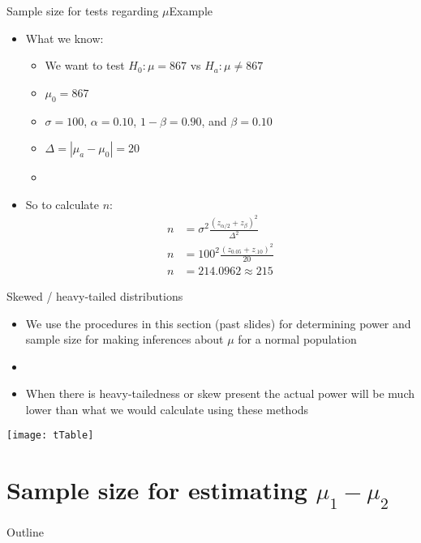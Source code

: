 \documentclass[xcolor=dvipsnames]{beamer}
\begin{document}
\begin{frame}{Sample size for tests regarding $\mu$}{Example}
	\begin{itemize}
		\item What we know:
		\begin{itemize}
			\item We want to test $H_0: \mu = 867$ vs $H_a: \mu \neq 867$
			\item $\mu_0 = 867$
			\item $\sigma = 100$, $\alpha = 0.10$, $1-\beta = 0.90$, and $\beta = 0.10$
			\item $\Delta = |\mu_a - \mu_0| = 20$
			\item[]
		\end{itemize} \pause
		\item So to calculate $n$: \pause
		\begin{align*}
			n &= \sigma^2\frac{(z_{\alpha/2} + z_{\beta})^2}{\Delta^2} \\
			n &= 100^2\frac{(z_{0.05} + z_{.10})^2}{20} \\
			n &= 214.0962 \approx 215
		\end{align*}
	\end{itemize}
\end{frame}

\begin{frame}{Skewed / heavy-tailed distributions}
	\begin{itemize}
		\item We use the procedures in this section (past slides) for determining power and sample size for making inferences about $\mu$ for a normal population \pause
		\item[]
		\item When there is heavy-tailedness or skew present the actual power will be much lower than what we would calculate using these methods
	\end{itemize}
\begin{center}
	\texttt{[image: tTable]}
\end{center}
\end{frame}

\section{Sample size for estimating $\mu_1 - \mu_2$}
\begin{frame}{Outline}
	\tableofcontents[currentsection,subsectionstyle=show/shaded/hide]
\end{frame}
\end{document}
